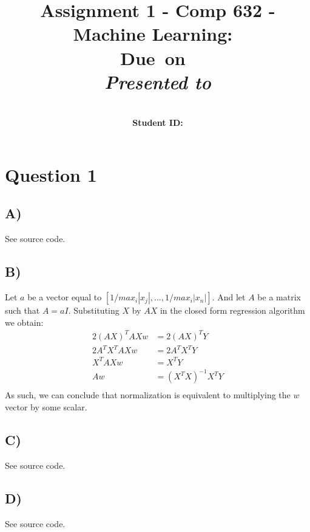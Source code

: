 \documentclass{report}
\title{Assignment 1 - Comp 632 - Machine Learning}
\title{\vspace{2in}\textmd{\textbf{\hmwkClass:\ \hmwkTitle}}\\
\normalsize\vspace{0.1in}\small{Due\ on\ \hmwkDueDate}\\
\vspace{0.1in}\large{\textit{Presented to \hmwkClassInstructor}}\vspace{3in}}
\date{}
\author{\textbf{\hmwkAuthorName}\\
    \textbf{Student ID: \hmwkAuthorNumber}}
\begin{document}
\maketitle
\section*{Question 1}
\subsection*{A)}
See source code.
\subsection*{B)}
Let $a$ be a vector equal to $[1/max_i |x_j|, ..., 1/max_i |x_n|]$. And let $A$
be a matrix such that $A=aI$. Substituting $X$ by $AX$ in the closed form regression
algorithm we obtain:
\begin{equation}
  \begin{aligned}
  2(AX)^TAXw &= 2(AX)^TY \\
  2A^TX^TAXw &= 2A^TX^TY \\
  X^TAXw &= X^TY \\
  Aw &= (X^TX)^{-1}X^TY \\
  \end{aligned}
\end{equation}
As such, we can conclude that normalization is equivalent to multiplying the $w$
vector by some scalar.
\subsection*{C)}
See source code.
\subsection*{D)}
See source code.
\end{document}
